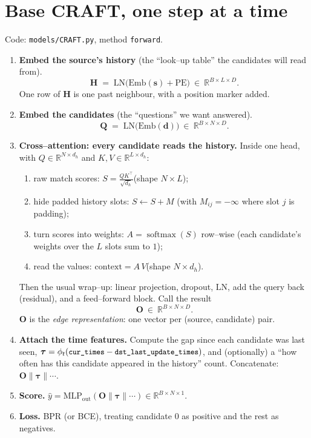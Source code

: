 \documentclass[11pt]{article}
\newcommand{\R}{\mathbb{R}}
\newcommand{\softmax}{\operatorname{softmax}}
\newcommand{\code}[1]{\texttt{\small #1}}
\newcommand{\concat}{\mathbin{\|}}       %
\newcommand{\Emb}{\mathrm{Emb}}
\newcommand{\LN}{\mathrm{LN}}
\newcommand{\pos}{\mathrm{PE}}
\begin{document}
\section{Base CRAFT, one step at a time}
\label{sec:craft}

Code: \code{models/CRAFT.py}, method \code{forward}.

\begin{enumerate}[label=\textbf{C\arabic*.},leftmargin=3.2em]
  \item \textbf{Embed the source's history} (the ``look--up table'' the
        candidates will read from).
        \[
          \bm{H} \;=\; \LN\big(\Emb(\bm{s}) + \pos\big)\ \in\ \R^{B\times L\times D}.
        \]
        One row of $\bm{H}$ is one past neighbour, with a position marker added.

  \item \textbf{Embed the candidates} (the ``questions'' we want answered).
        \[
          \bm{Q} \;=\; \LN\big(\Emb(\bm{d})\big)\ \in\ \R^{B\times N\times D}.
        \]

  \item \textbf{Cross--attention: every candidate reads the history.}
        Inside one head, with $Q\in\R^{N\times d_h}$ and $K,V\in\R^{L\times d_h}$:
        \begin{enumerate}[label=(\alph*),nosep]
          \item raw match scores: \(\displaystyle S = \frac{QK^{\top}}{\sqrt{d_h}}\)\quad(shape $N\times L$);
          \item hide padded history slots: \(S \leftarrow S + M\) (with $M_{ij}=-\infty$ where slot $j$ is padding);
          \item turn scores into weights: \(A = \softmax(S)\) row--wise (each candidate's weights over the $L$ slots sum to $1$);
          \item read the values: \(\text{context} = A\,V\)\quad(shape $N\times d_h$).
        \end{enumerate}
        Then the usual wrap--up: linear projection, dropout, $\LN$, add the
        query back (residual), and a feed--forward block. Call the result
        \[
          \bm{O}\ \in\ \R^{B\times N\times D}.
        \]
        $\bm{O}$ is the \emph{edge representation}: one vector per
        (source, candidate) pair.

  \item \textbf{Attach the time features.} Compute the gap since each candidate
        was last seen, \(\bm{\tau}=\phi_t(\code{cur\_times}-\code{dst\_last\_update\_times})\),
        and (optionally) a ``how often has this candidate appeared in the
        history'' count. Concatenate:
        \(\bm{O} \concat \bm{\tau} \concat \cdots\).

  \item \textbf{Score.} \(\hat{y} = \mathrm{MLP}_{\text{out}}(\bm{O}\concat\bm{\tau}\concat\cdots)\in\R^{B\times N\times 1}\).

  \item \textbf{Loss.} BPR (or BCE), treating candidate $0$ as positive and the
        rest as negatives.
\end{enumerate}
\end{document}

